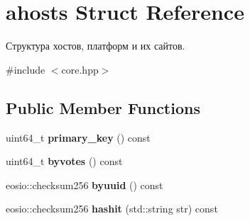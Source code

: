 \hypertarget{structahosts}{}\section{ahosts Struct Reference}
\label{structahosts}


Структура хостов, платформ и их сайтов.  




{\ttfamily \#include $<$core.\+hpp$>$}

\subsection*{Public Member Functions}
\begin{DoxyCompactItemize}
\item 
\mbox{\label{structahosts_a8ff41a09e57821f7cc3387745bc6741a}} 
uint64\+\_\+t {\bfseries primary\+\_\+key} () const
\item 
\mbox{\label{structahosts_a955bf97cffd800a2dd92b98a880a9542}} 
uint64\+\_\+t {\bfseries byvotes} () const
\item 
\mbox{\label{structahosts_afe74aae22696c6962ec2d16b355f67b0}} 
eosio\+::checksum256 {\bfseries byuuid} () const
\item 
\mbox{\label{structahosts_acb8473ca1f7a2e6de6df5afe7fdc710a}} 
eosio\+::checksum256 {\bfseries hashit} (std\+::string str) const
\end{DoxyCompactItemize}
